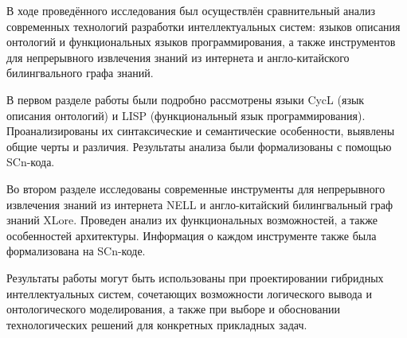 
В ходе проведённого исследования был осуществлён сравнительный анализ современных технологий разработки интеллектуальных систем: языков описания онтологий и функциональных языков программирования, а также инструментов для непрерывного извлечения знаний из интернета и англо-китайского билингвального графа знаний.

В первом разделе работы были подробно рассмотрены языки CycL (язык описания онтологий) и LISP (функциональный язык программирования). Проанализированы их синтаксические и семантические особенности, выявлены общие черты и различия. Результаты анализа были формализованы с помощью SCn-кода.

Во втором разделе исследованы современные инструменты для непрерывного извлечения знаний из интернета NELL и англо-китайский билингвальный граф знаний XLore. Проведен анализ их функциональных возможностей, а также особенностей архитектуры. Информация о каждом инструменте также была формализована на SCn-коде.

Результаты работы могут быть использованы при проектировании гибридных интеллектуальных систем, сочетающих возможности логического вывода и онтологического моделирования, а также при выборе и обосновании технологических решений для конкретных прикладных задач.